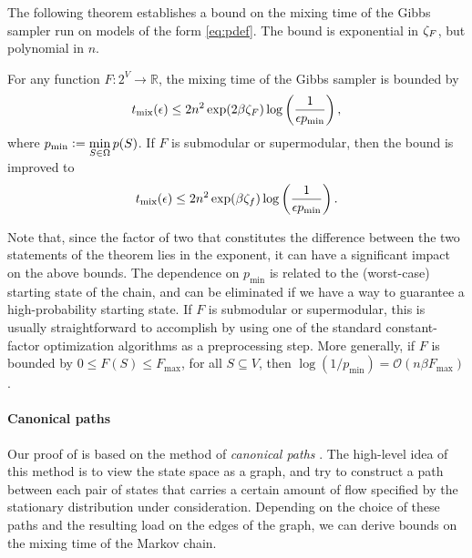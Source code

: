 The following theorem establishes a bound on the mixing time of the Gibbs sampler run on models of the form \eqref{eq:pdef}.
The bound is exponential in $\zeta_F$, but polynomial in $n$.
\begin{theorem} \label{thm:poly}
  For any function $F : 2^V \to \mathbb{R}$, the mixing time of the Gibbs sampler is bounded by
  \begin{align*}
    t_{\mathrm{mix}}(\epsilon) \leq 2n^2 \exp(2 \beta \zeta_F) \log\left(\frac{1}{\epsilon p_{\min}}\right),
  \end{align*}
  where $p_{\min} \vcentcolon= \displaystyle\min_{S \in \Omega}p(S)$.
  If $F$ is submodular or supermodular, then the bound is improved to
  \begin{align*}
    t_{\mathrm{mix}}(\epsilon) \leq 2n^2 \exp(\beta \zeta_f) \log\left(\frac{1}{\epsilon p_{\min}}\right).
  \end{align*}
\end{theorem}
Note that, since the factor of two that constitutes the difference between the two statements of the theorem lies in the exponent, it can have a significant impact on the above bounds.
The dependence on $p_{\min}$ is related to the (worst-case) starting state of the chain, and can be eliminated if we have a way to guarantee a high-probability starting state.
If $F$ is submodular or supermodular, this is usually straightforward to accomplish by using one of the standard constant-factor optimization algorithms \cite{nemhauser78,fujishige05} as a preprocessing step.
More generally, if $F$ is bounded by $0 \leq F(S) \leq F_{\max}$, for all $S \subseteq V$, then $\log (1/p_{\min}) = \mathcal{O}(n \beta F_{\max})$.

\paragraph{Canonical paths}
Our proof of  is based on the method of \emph{canonical paths} \cite{jerrum03,sinclair92,jerrum89,diaconis91}.
The high-level idea of this method is to view the state space as a graph, and try to construct a path between each pair of states that carries a certain amount of flow specified by the stationary distribution under consideration.
Depending on the choice of these paths and the resulting load on the edges of the graph, we can derive bounds on the mixing time of the Markov chain.

